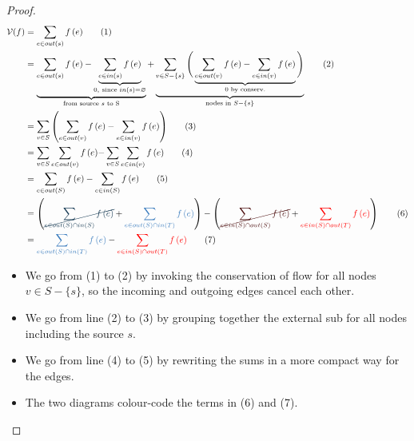 \documentclass[a4paper]{article}
\begin{document}
\begin{multicols}{2}


\columnbreak


\end{multicols}
\begin{proof}
\begin{align}
    \mathcal{V}(f)&=\sum\limits_{e\in out\left( s \right)}{f\left( e \right)} \tag{1}\\
   &=\underbrace{\sum\limits_{e\in out\left( s \right)}{f\left( e \right)}-\underbrace{\sum\limits_{e\in in\left( s \right)}{f\left( e \right)}}_{0,\ \text{since }in\left( s \right)=\varnothing }}_{\text{from source }s\text{ to S}}+
   \underbrace{\sum\limits_{v\in S-\left\{ s \right\}}{\Bigg( \underbrace{\sum\limits_{e\in out\left( v \right)}{f\left( e \right)}-\sum\limits_{e\in in\left( v \right)}{f\left( e \right)}}_{0\text{ by conserv}\text{.}} \Bigg)}}_{\text{nodes in }S-\left\{ s \right\}} \tag{2}\\
   &=\sum\limits_{v\in S}{\left( \sum\limits_{e\in out\left( v \right)}{f\left( e \right)}-\sum\limits_{e\in in\left( v \right)}{f\left( e \right)} \right)} \tag{3} \\
   &=\sum\limits_{v\in S}{\sum\limits_{e\in out\left( v \right)}{f\left( e \right)}-}\sum\limits_{v\in S}{\sum\limits_{e\in in\left( v \right)}{f\left( e \right)}} \tag{4}\\
   &=\sum\limits_{e\in out\left( S \right)}{f\left( e \right)}-\sum\limits_{e\in in\left( S \right)}{f\left( e \right)} \tag{5}\\
   &=\left( \textcolor{dark_blue}{ \cancel{\sum\limits_{e\in out\left( S \right)\cap in\left( S \right)}{f\left( e \right)}} } +
   \textcolor{medium_blue}{\sum\limits_{e\in out\left( S \right)\cap in\left( T \right)} {f\left( e \right)} } \right)-
   \left( \textcolor{dark_red}{\cancel{\sum\limits_{e\in in\left( S \right)\cap out\left( S \right)}{f\left( e \right)}}}+
   \textcolor{red}{\sum\limits_{e\in in\left( S \right)\cap out\left( T \right)}{f\left( e \right)}} \right) \tag{6}\\
   &=\textcolor{medium_blue}{\sum\limits_{e\in out\left( S \right)\cap in\left( T \right)}{f\left( e \right)}}-
   \textcolor{red}{\sum\limits_{e\in in\left( S \right)\cap out\left( T \right)}{f\left( e \right)}} \tag{7}
\end{align}
\begin{itemize}
    \item We go from (1) to (2) by invoking the conservation of flow for all nodes $v \in S - \{s\}$, so the incoming and outgoing edges cancel each other.
    \item We go from line (2) to (3) by grouping together the external sub for all nodes including the source $s$. 
    \item We go from line (4) to (5) by rewriting the sums in a more compact way for the edges.
    \item The two diagrams colour-code the terms in (6) and (7).
\end{itemize}
\end{proof}
\end{document}

